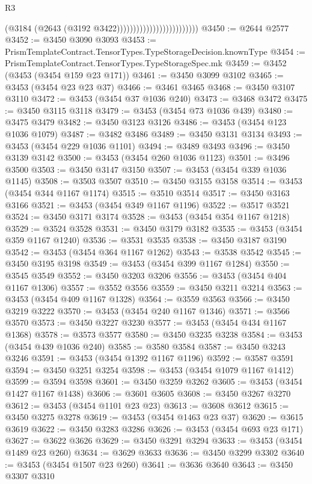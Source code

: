 \begin{lexlean}{R3}
\begin{coremodule}
                                                (@3184 (@2643 (@3192 @3422)))))))))))))))))))))))))
@3450 := @2644 @2577
@3452 := @3450 @3090 @3093
@3453 := PrismTemplateContract.TensorTypes.TypeStorageDecision.knownType
@3454 := PrismTemplateContract.TensorTypes.TypeStorageSpec.mk
@3459 := @3452 (@3453 (@3454 @159 @23 @171))
@3461 := @3450 @3099 @3102
@3465 := @3453 (@3454 @23 @23 @37)
@3466 := @3461 @3465
@3468 := @3450 @3107 @3110
@3472 := @3453 (@3454 @37 @1036 @240)
@3473 := @3468 @3472
@3475 := @3450 @3115 @3118
@3479 := @3453 (@3454 @73 @1036 @439)
@3480 := @3475 @3479
@3482 := @3450 @3123 @3126
@3486 := @3453 (@3454 @123 @1036 @1079)
@3487 := @3482 @3486
@3489 := @3450 @3131 @3134
@3493 := @3453 (@3454 @229 @1036 @1101)
@3494 := @3489 @3493
@3496 := @3450 @3139 @3142
@3500 := @3453 (@3454 @260 @1036 @1123)
@3501 := @3496 @3500
@3503 := @3450 @3147 @3150
@3507 := @3453 (@3454 @339 @1036 @1145)
@3508 := @3503 @3507
@3510 := @3450 @3155 @3158
@3514 := @3453 (@3454 @344 @1167 @1174)
@3515 := @3510 @3514
@3517 := @3450 @3163 @3166
@3521 := @3453 (@3454 @349 @1167 @1196)
@3522 := @3517 @3521
@3524 := @3450 @3171 @3174
@3528 := @3453 (@3454 @354 @1167 @1218)
@3529 := @3524 @3528
@3531 := @3450 @3179 @3182
@3535 := @3453 (@3454 @359 @1167 @1240)
@3536 := @3531 @3535
@3538 := @3450 @3187 @3190
@3542 := @3453 (@3454 @364 @1167 @1262)
@3543 := @3538 @3542
@3545 := @3450 @3195 @3198
@3549 := @3453 (@3454 @399 @1167 @1284)
@3550 := @3545 @3549
@3552 := @3450 @3203 @3206
@3556 := @3453 (@3454 @404 @1167 @1306)
@3557 := @3552 @3556
@3559 := @3450 @3211 @3214
@3563 := @3453 (@3454 @409 @1167 @1328)
@3564 := @3559 @3563
@3566 := @3450 @3219 @3222
@3570 := @3453 (@3454 @240 @1167 @1346)
@3571 := @3566 @3570
@3573 := @3450 @3227 @3230
@3577 := @3453 (@3454 @434 @1167 @1368)
@3578 := @3573 @3577
@3580 := @3450 @3235 @3238
@3584 := @3453 (@3454 @439 @1036 @240)
@3585 := @3580 @3584
@3587 := @3450 @3243 @3246
@3591 := @3453 (@3454 @1392 @1167 @1196)
@3592 := @3587 @3591
@3594 := @3450 @3251 @3254
@3598 := @3453 (@3454 @1079 @1167 @1412)
@3599 := @3594 @3598
@3601 := @3450 @3259 @3262
@3605 := @3453 (@3454 @1427 @1167 @1438)
@3606 := @3601 @3605
@3608 := @3450 @3267 @3270
@3612 := @3453 (@3454 @1101 @23 @23)
@3613 := @3608 @3612
@3615 := @3450 @3275 @3278
@3619 := @3453 (@3454 @1463 @23 @37)
@3620 := @3615 @3619
@3622 := @3450 @3283 @3286
@3626 := @3453 (@3454 @693 @23 @171)
@3627 := @3622 @3626
@3629 := @3450 @3291 @3294
@3633 := @3453 (@3454 @1489 @23 @260)
@3634 := @3629 @3633
@3636 := @3450 @3299 @3302
@3640 := @3453 (@3454 @1507 @23 @260)
@3641 := @3636 @3640
@3643 := @3450 @3307 @3310

\end{coremodule}
\end{lexlean}
